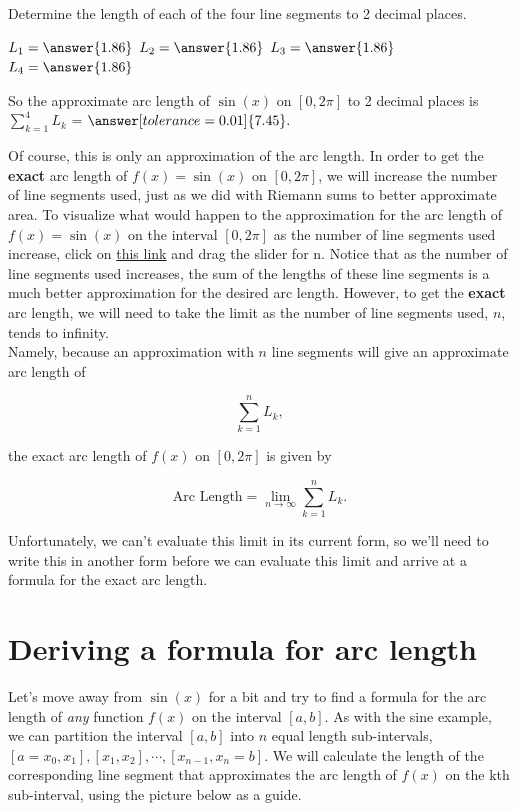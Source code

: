 \documentclass[handout,nooutcomes]{ximera}
\begin{document}

\begin{problem}
Determine the length of each of the four line segments to 2 decimal places.

$L_1 = \answer{1.86}$
$L_2 = \answer{1.86}$
$L_3 = \answer{1.86}$
$L_4 = \answer{1.86}$

So the approximate arc length of $\sin(x)$ on $[0, 2\pi]$ to 2 decimal places is $\displaystyle\sum_{k=1}^4 L_k$ = $\answer[tolerance=0.01]{7.45}.$
\end{problem}

Of course, this is only an approximation of the arc length.  In order to get the \textbf{exact} arc length of $f(x) = \sin(x)$ on $[0, 2\pi]$, we will increase the number of line segments used, just as we did with Riemann sums to better approximate area.  To visualize what would happen to the approximation for the arc length of $f(x)=\sin(x)$ on the interval $[0,2\pi]$ as the number of line segments used increase, click on \href{https://www.desmos.com/calculator/lmz7n25cgl}{this link} and drag the slider for n.  Notice that as the number of line segments used increases, the sum of the lengths of these line segments is a much better approximation for the desired arc length.  However, to get the \textbf{exact} arc length, we will need to take the limit as the number of line segments used, $n$, tends to infinity.  \\

Namely, because an approximation with $n$ line segments will give an approximate arc length of 

$$\displaystyle\sum_{k=1}^n L_k,$$ 

the exact arc length of $f(x)$ on $[0, 2\pi]$ is given by 

$$\text{Arc Length} = \displaystyle\lim_{n \to \infty} \displaystyle\sum_{k=1}^n L_k.$$  

Unfortunately, we can't evaluate this limit in its current form, so we'll need to write this in another form before we can evaluate this limit and arrive at a formula for the exact arc length.  \\

\section {Deriving a formula for arc length}

Let's move away from $\sin(x)$ for a bit and try to find a formula for the arc length of \textit{any} function $f(x)$ on the interval $[a,b].$  As with the sine example, we can partition the interval $[a,b]$ into $n$ equal length sub-intervals, $[a=x_0, x_1], [x_1, x_2], \cdots , [x_{n-1}, x_n = b].$  We will calculate the length of the corresponding line segment that approximates the arc length of $f(x)$ on the kth sub-interval, using the picture below as a guide.  
\end{document}
